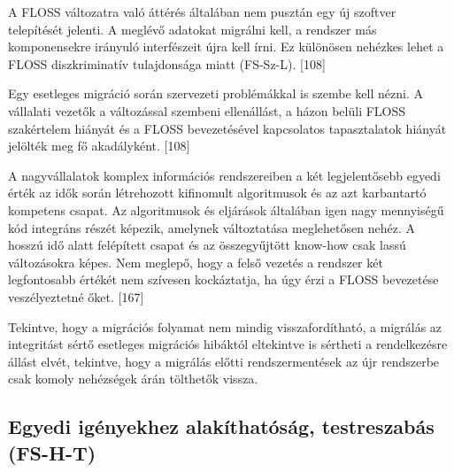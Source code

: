 \documentclass[12pt,magyar,a4paper,oneside]{scrreprt}
\begin{document}
A FLOSS változatra való áttérés általában nem pusztán egy új szoftver
telepítését jelenti. A meglévő adatokat migrálni kell, a rendszer más
komponensekre irányuló interfészeit újra kell írni. Ez különösen
nehézkes lehet a FLOSS diszkriminatív tulajdonsága miatt (FS-Sz-L).
{[}108{]}

Egy esetleges migráció során szervezeti problémákkal is szembe kell
nézni. A vállalati vezetők a változással szembeni ellenállást, a házon
belüli FLOSS szakértelem hiányát és a FLOSS bevezetésével kapcsolatos
tapasztalatok hiányát jelölték meg fő akadályként. {[}108{]}

A nagyvállalatok komplex információs rendszereiben a két legjelentősebb
egyedi érték az idők során létrehozott kifinomult algoritmusok és az azt
karbantartó kompetens csapat. Az algoritmusok és eljárások általában
igen nagy mennyiségű kód integráns részét képezik, amelynek változtatása
meglehetősen nehéz. A hosszú idő alatt felépített csapat és az
összegyűjtött know-how csak lassú változásokra képes. Nem meglepő, hogy
a felső vezetés a rendszer két legfontosabb értékét nem szívesen
kockáztatja, ha úgy érzi a FLOSS bevezetése veszélyeztetné őket.
{[}167{]}

Tekintve, hogy a migrációs folyamat nem mindig visszafordítható, a
migrálás az integritást sértő esetleges migrációs hibáktól eltekintve is
sértheti a rendelkezésre állást elvét, tekintve, hogy a migrálás előtti
rendszermentések az újr rendszerbe csak komoly nehézségek árán tölthetők
vissza.

\hypertarget{sec:FS-H-T}{%
\subsection{Egyedi igényekhez alakíthatóság, testreszabás
(FS-H-T)}\label{sec:FS-H-T}}
\end{document}
